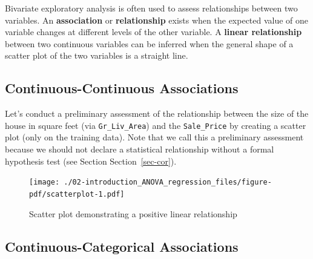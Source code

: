\documentclass[
  letterpaper,
  DIV=11,
  numbers=noendperiod]{scrreprt}
\newenvironment{Shaded}{\begin{snugshade}}{\end{snugshade}}
\newcommand{\AttributeTok}[1]{\textcolor[rgb]{0.40,0.45,0.13}{#1}}
\newcommand{\DecValTok}[1]{\textcolor[rgb]{0.68,0.00,0.00}{#1}}
\newcommand{\FunctionTok}[1]{\textcolor[rgb]{0.28,0.35,0.67}{#1}}
\newcommand{\NormalTok}[1]{\textcolor[rgb]{0.00,0.23,0.31}{#1}}
\newcommand{\SpecialCharTok}[1]{\textcolor[rgb]{0.37,0.37,0.37}{#1}}
\newcommand{\StringTok}[1]{\textcolor[rgb]{0.13,0.47,0.30}{#1}}
\begin{document}
Bivariate exploratory analysis is often used to assess relationships
between two variables. An \textbf{association} or \textbf{relationship}
exists when the expected value of one variable changes at different
levels of the other variable. A \textbf{linear relationship} between two
continuous variables can be inferred when the general shape of a scatter
plot of the two variables is a straight line.

\hypertarget{continuous-continuous-associations}{%
\subsection{Continuous-Continuous
Associations}\label{continuous-continuous-associations}}

Let's conduct a preliminary assessment of the relationship between the
size of the house in square feet (via \texttt{Gr\_Liv\_Area}) and the
\texttt{Sale\_Price} by creating a scatter plot (only on the training
data). Note that we call this a preliminary assessment because we should
not declare a statistical relationship without a formal hypothesis test
(see Section Section~\ref{sec-cor}).

\begin{Shaded}
\end{Shaded}

\begin{figure}[H]

{\centering \texttt{[image: ./02-introduction\_ANOVA\_regression\_files/figure-pdf/scatterplot-1.pdf]}

}

\caption{Scatter plot demonstrating a positive linear relationship}

\end{figure}

\hypertarget{continuous-categorical-associations}{%
\subsection{Continuous-Categorical
Associations}\label{continuous-categorical-associations}}
\end{document}
